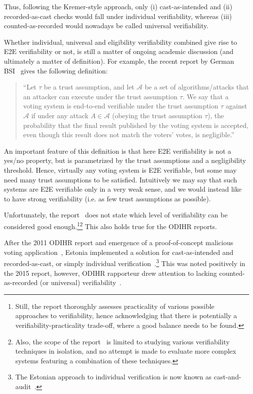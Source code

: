 \documentclass{llncs}
\begin{document}
Thus, following the Kremer-style approach, only (i) cast-as-intended and (ii) recorded-as-cast checks would fall under individual verifiability, whereas (iii) counted-as-recorded would nowadays be called universal verifiability. 

Whether individual, universal and eligibility verifiability combined give rise to E2E verifiability or not, is still a matter of ongoing academic discussion (and ultimately a matter of definition). For example, the recent report by German BSI~\cite{BSIE2E} gives the following definition:
\begin{quote}
    ``Let $\tau$ be a trust assumption, and let $\mathcal{A}$
be a set of algorithms/attacks that an attacker can execute under the trust assumption $\tau$. We say that
a voting system is end-to-end verifiable under the trust assumption $\tau$ against  $\mathcal{A}$ if under any attack
$A \in\mathcal{A}$ (obeying the trust assumption $\tau$), the probability that the final result published by the voting
system is accepted, even though this result does not match the voters' votes, is negligible.''
\end{quote}

An important feature of this definition is that here E2E verifiability is not a yes/no property, but is parametrized by the trust assumptions and a negligibility threshold. Hence, virtually any voting system is E2E verifiable, but some may need many trust assumptions to be satisfied. Intuitively we may say that such systems are E2E verifiable only in a very weak sense, and we would instead like to have strong verifiability (i.e. as few trust assumptions as possible). 

Unfortunately, the report~\cite{BSIE2E} does not state which level of verifiability can be considered good enough.\footnote{Still, the report thoroughly assesses practicality of various possible approaches to verifiability, hence acknowledging that there is potentially a verifiability-practicality trade-off, where a good balance needs to be found.}\footnote{Also, the scope of the report~\cite{BSIE2E} is limited to studying various verifiability techniques in isolation, and no attempt is made to evaluate more complex systems featuring a combination of these techniques.} This also holds true for the ODIHR reports. 

After the 2011 ODIHR report and emergence of a proof-of-concept malicious voting application~\cite{heiberg2014modeling}, Estonia implemented a solution for cast-as-intended and recorded-as-cast, or simply individual verification~\cite{DBLP:conf/ev/HeibergW14}.\footnote{The Estonian approach to individual verification is now known as cast-and-audit~\cite{BSIE2E}.} This was noted positively in the 2015 report, however, ODIHR rapporteur drew attention to lacking counted-as-recorded (or universal) verifiability~\cite{ODIHR2015}. 
\end{document}
